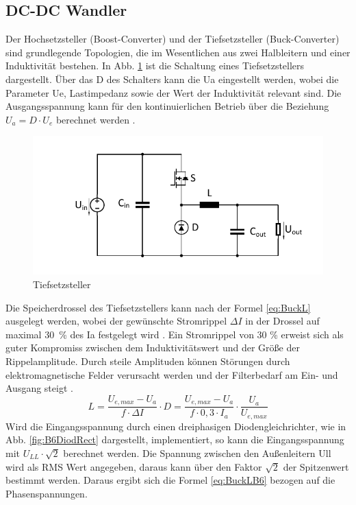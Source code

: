 		\subsection{DC-DC Wandler} \label{sec:Buck}
		Der Hochsetzsteller (Boost-Converter) und der Tiefsetzsteller (Buck-Converter) sind grundlegende Topologien, die im Wesentlichen aus zwei Halbleitern und einer Induktivität bestehen. In Abb. \ref{fig:buck} ist die Schaltung eines Tiefsetzstellers dargestellt. Über das \gls{D} des Schalters kann die \gls{Ua} eingestellt werden, wobei die Parameter \gls{Ue}, Lastimpedanz sowie der Wert der Induktivität relevant sind. Die Ausgangsspannung kann für den kontinuierlichen Betrieb über die Beziehung $U_{a}=D\cdot U_{e} $ berechnet werden \cite{schmidtwalter}.
		\begin{figure} [t]
			\centering
			\includegraphics[width=0.9\linewidth]{content/Grafiken/Buck}
			\caption[Tiefsetzsteller]{Tiefsetzsteller}
			\label{fig:buck}
		\end{figure}
		Die Speicherdrossel des Tiefsetzstellers kann nach der Formel \ref{eq:BuckL} ausgelegt werden, wobei der gewünschte Stromrippel $\Delta I $ in der Drossel auf maximal 30~\% des \gls{Ia} festgelegt wird \cite{schmidtwalter}. Ein Stromrippel von 30 \% erweist sich als guter Kompromiss zwischen dem Induktivitätswert und der Größe der Rippelamplitude. Durch steile Amplituden können Störungen durch elektromagnetische Felder verursacht werden und der Filterbedarf am Ein- und Ausgang steigt \cite{AnalogInductor} \cite{TIBuck}.
		\begin{equation}
			\label{eq:BuckL}
			L=\dfrac{U_{e,max}-U_{a}}{f\cdot \Delta I}\cdot D = \dfrac{U_{e,max}-U_{a}}{f\cdot 0,3 \cdot I_{a}}\cdot \dfrac{U_{a}}{U_{e,max}}
		\end{equation}
		Wird die Eingangsspannung durch einen dreiphasigen Diodengleichrichter, wie in Abb. \ref{fig:B6DiodRect} dargestellt,  implementiert, so kann die Eingangsspannung mit $U_{LL} \cdot \sqrt{2}$ berechnet werden. Die Spannung zwischen den Außenleitern \gls{Ull} wird als \gls{RMS} Wert angegeben, daraus kann über den Faktor $\sqrt{2}$ der Spitzenwert bestimmt werden. Daraus ergibt sich die Formel \ref{eq:BuckLB6} bezogen auf die Phasenspannungen. \\

